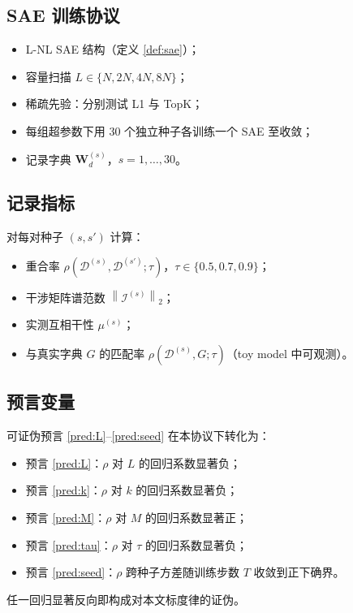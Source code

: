 \documentclass[11pt,a4paper]{article}
\theoremstyle{remark}
\newcommand{\W}{\bm{W}}
\newcommand{\I}{\mathcal{I}}
\newcommand{\Dict}{\mathcal{D}}
\newcommand{\norm}[1]{\left\lVert#1\right\rVert}
\begin{document}
\subsection{SAE 训练协议}

\begin{itemize}[leftmargin=*,itemsep=2pt]
\item L-NL SAE 结构（定义 \ref{def:sae}）；
\item 容量扫描 $L \in \{N, 2N, 4N, 8N\}$；
\item 稀疏先验：分别测试 L1 与 TopK；
\item 每组超参数下用 30 个独立种子各训练一个 SAE 至收敛；
\item 记录字典 $\W_d^{(s)}$，$s = 1, \ldots, 30$。
\end{itemize}

\subsection{记录指标}

对每对种子 $(s, s')$ 计算：
\begin{itemize}[leftmargin=*,itemsep=2pt]
\item 重合率 $\rho(\Dict^{(s)}, \Dict^{(s')}; \tau)$，$\tau \in \{0.5, 0.7, 0.9\}$；
\item 干涉矩阵谱范数 $\norm{\I^{(s)}}_2$；
\item 实测互相干性 $\mu^{(s)}$；
\item 与真实字典 $G$ 的匹配率 $\rho(\Dict^{(s)}, G; \tau)$（toy model 中可观测）。
\end{itemize}

\subsection{预言变量}

可证伪预言 \ref{pred:L}–\ref{pred:seed} 在本协议下转化为：
\begin{itemize}[leftmargin=*,itemsep=2pt]
\item 预言 \ref{pred:L}：$\rho$ 对 $L$ 的回归系数显著负；
\item 预言 \ref{pred:k}：$\rho$ 对 $k$ 的回归系数显著负；
\item 预言 \ref{pred:M}：$\rho$ 对 $M$ 的回归系数显著正；
\item 预言 \ref{pred:tau}：$\rho$ 对 $\tau$ 的回归系数显著负；
\item 预言 \ref{pred:seed}：$\rho$ 跨种子方差随训练步数 $T$ 收敛到正下确界。
\end{itemize}
任一回归显著反向即构成对本文标度律的证伪。
\end{document}
